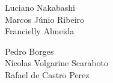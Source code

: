 \documentclass[12pt,a4paper]{article}
\begin{document}
\begin{multicols}{2}

\begin{flushleft}
Luciano Nakabashi \\        
Marcos Júnio Ribeiro \\
Francielly Almeida  \\
\end{flushleft}

\begin{flushright}
Pedro Borges \\
Nícolas Volgarine Scaraboto \\
Rafael de Castro Perez \\
\end{flushright}

\end{multicols}

\vspace{0.2cm}










\end{document}
